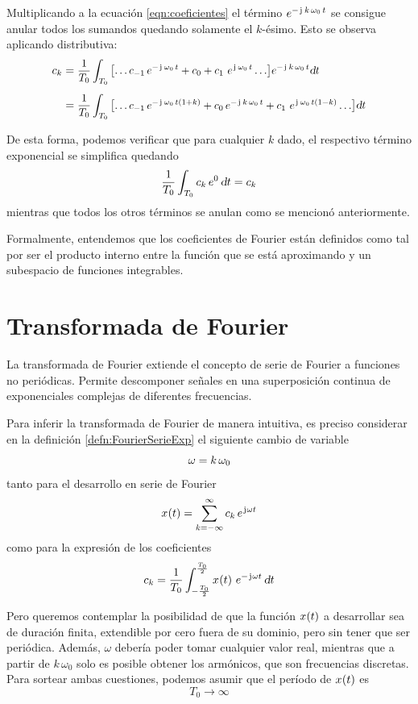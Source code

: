 Multiplicando a la ecuación \ref{eqn:coeficientes} el término $e^{-\iu \, \kth \, \omega_0 \, t}$ se consigue anular todos los sumandos quedando solamente el $k$-ésimo.
Esto se observa aplicando distributiva:
\begin{align*}
    c_\kth &=
    \scale{0.95}{
    \frac{1}{T_0} \int_{T_0} \inBrackets{\dots c_{-1} \, e^{-\iu \, \omega_0 \, t} + c_0 + c_1 \, \, e^{\iu \, \omega_0 \, t} \dots} e^{-\iu \, \kth \, \omega_0 \, t} \dif t
    }
    \\[1ex]
    &= 
    \scale{0.95}{
    \frac{1}{T_0} \int_{T_0} \inBrackets{\dots c_{-1} \, e^{-\iu \, \omega_0 \, t \inParentheses{1 + k}} + c_0 \, e^{-\iu \, \kth \, \omega_0 \, t} + c_1 \, \, e^{\iu \, \omega_0 \, t \inParentheses{1 - k}} \dots} \dif t
    }
\end{align*}

De esta forma, podemos verificar que para cualquier $k$ dado, el respectivo término exponencial se simplifica quedando
\[
    \frac{1}{T_0} \int_{T_0} c_k \, e^0 \, \dif t = c_k
\]
mientras que todos los otros términos se anulan como se mencionó anteriormente.

Formalmente, entendemos que los coeficientes de Fourier están definidos como tal por ser el producto interno entre la función que se está aproximando y un subespacio de funciones integrables.

\section{Transformada de Fourier}

La transformada de Fourier extiende el concepto de serie de Fourier a funciones no periódicas.
Permite descomponer señales en una superposición continua de exponenciales complejas de diferentes frecuencias.

Para inferir la transformada de Fourier de manera intuitiva, es preciso considerar en la definición \ref{defn:FourierSerieExp} el siguiente cambio de variable
\[
    \omega = \kth \, \omega_0
\]
tanto para el desarrollo en serie de Fourier
\begin{equation}
    \fx[x]{t}
    = \sum_{\kth=-\infty}^\infty
    c_\kth \, \complexExp
    \label{eqn:serieFourierOmega}
\end{equation}
como para la expresión de los coeficientes
\[
    c_\kth =
    \frac{1}{T_0}
    \int_{-\frac{T_0}{2}}^{\frac{T_0}{2}} \fx[x]{t} \, e^{- \iu \omega t}
    \, \dif t
\]

Pero queremos contemplar la posibilidad de que la función $\fx[x]{t}$ a desarrollar sea de duración finita, extendible por cero fuera de su dominio, pero sin tener que ser periódica.
Además, $\omega$ debería poder tomar cualquier valor real, mientras que a partir de $k \, \omega_0$ solo es posible obtener los armónicos, que son frecuencias discretas.
Para sortear ambas cuestiones, podemos asumir que el período de $\fx[x]{t}$ es
\[
    T_0 \to \infty
\]

